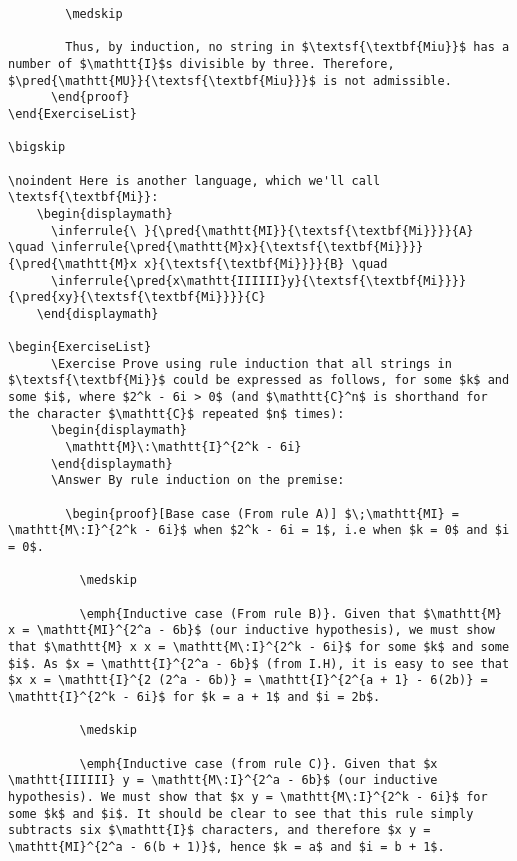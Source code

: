 \documentclass{book}
\begin{document}
\begin{verbatim}
        \medskip
        
        Thus, by induction, no string in $\textsf{\textbf{Miu}}$ has a number of $\mathtt{I}$s divisible by three. Therefore, $\pred{\mathtt{MU}}{\textsf{\textbf{Miu}}}$ is not admissible.        
      \end{proof}
\end{ExerciseList}

\bigskip

\noindent Here is another language, which we'll call \textsf{\textbf{Mi}}:
    \begin{displaymath}
      \inferrule{\ }{\pred{\mathtt{MI}}{\textsf{\textbf{Mi}}}}{A} \quad \inferrule{\pred{\mathtt{M}x}{\textsf{\textbf{Mi}}}}{\pred{\mathtt{M}x x}{\textsf{\textbf{Mi}}}}{B} \quad
      \inferrule{\pred{x\mathtt{IIIIII}y}{\textsf{\textbf{Mi}}}}{\pred{xy}{\textsf{\textbf{Mi}}}}{C}
    \end{displaymath}
    
\begin{ExerciseList}
      \Exercise Prove using rule induction that all strings in $\textsf{\textbf{Mi}}$ could be expressed as follows, for some $k$ and some $i$, where $2^k - 6i > 0$ (and $\mathtt{C}^n$ is shorthand for the character $\mathtt{C}$ repeated $n$ times):
      \begin{displaymath}
        \mathtt{M}\:\mathtt{I}^{2^k - 6i}
      \end{displaymath}
      \Answer By rule induction on the premise:

        \begin{proof}[Base case (From rule A)] $\;\mathtt{MI} = \mathtt{M\:I}^{2^k - 6i}$ when $2^k - 6i = 1$, i.e when $k = 0$ and $i = 0$.
          
          \medskip
          
          \emph{Inductive case (From rule B)}. Given that $\mathtt{M} x = \mathtt{MI}^{2^a - 6b}$ (our inductive hypothesis), we must show that $\mathtt{M} x x = \mathtt{M\:I}^{2^k - 6i}$ for some $k$ and some $i$. As $x = \mathtt{I}^{2^a - 6b}$ (from I.H), it is easy to see that $x x = \mathtt{I}^{2 (2^a - 6b)} = \mathtt{I}^{2^{a + 1} - 6(2b)} = \mathtt{I}^{2^k - 6i}$ for $k = a + 1$ and $i = 2b$.
          
          \medskip
          
          \emph{Inductive case (from rule C)}. Given that $x \mathtt{IIIIII} y = \mathtt{M\:I}^{2^a - 6b}$ (our inductive hypothesis). We must show that $x y = \mathtt{M\:I}^{2^k - 6i}$ for some $k$ and $i$. It should be clear to see that this rule simply subtracts six $\mathtt{I}$ characters, and therefore $x y = \mathtt{MI}^{2^a - 6(b + 1)}$, hence $k = a$ and $i = b + 1$.
          

\end{verbatim}
\end{document}
